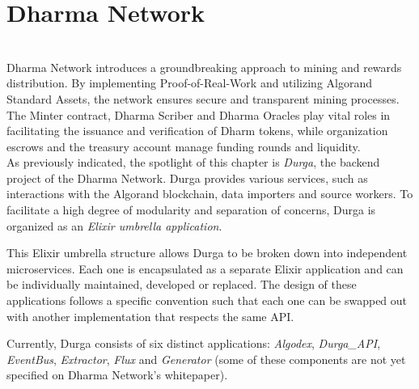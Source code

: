 \chapter{Dharma Network}\label{chap:chap4}

\\Dharma Network introduces a groundbreaking approach to mining and rewards distribution. By implementing Proof-of-Real-Work and utilizing Algorand Standard Assets, the network ensures secure and transparent mining processes. The Minter contract, Dharma Scriber and Dharma Oracles play vital roles in facilitating the issuance and verification of Dharm tokens, while organization escrows and the treasury account manage funding rounds and liquidity.\\

As previously indicated, the spotlight of this chapter is \textit{Durga}, the backend project of the Dharma Network. Durga provides various services, such as interactions with the Algorand blockchain, data importers and source workers. To facilitate a high degree of modularity and separation of concerns, Durga is organized as an \textit{Elixir umbrella application}.

This Elixir umbrella structure allows Durga to be broken down into independent microservices. Each one is encapsulated as a separate Elixir application and can be individually maintained, developed or replaced. The design of these applications follows a specific convention such that each one can be swapped out with another implementation that respects the same API.\newline

Currently, Durga consists of six distinct applications: \textit{Algodex}, \textit{Durga\_API}, \textit{EventBus}, \textit{Extractor}, \textit{Flux} and \textit{Generator} (some of these components are not yet specified on Dharma Network's whitepaper).


